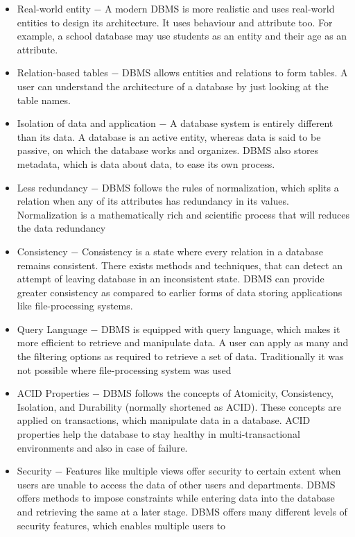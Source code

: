 \begin{itemize}
        \item{Real-world entity − A modern DBMS is more realistic and uses real-world entities to design
its architecture. It uses behaviour and attribute too. For example, a school database may use
students as an entity and their age as an attribute.}
     \item{Relation-based tables − DBMS allows entities and relations to form tables.
A user can understand the architecture of a database by just looking at the table names.}
    \item{Isolation of data and application − A database system is entirely different than its data. A
database is an active entity, whereas data is said to be passive, on which the database works
and organizes. DBMS also stores metadata, which is data about data, to ease its own
process.}
    \item{Less redundancy − DBMS follows the rules of normalization, which splits a relation when
any of its attributes has redundancy in its values. Normalization is a mathematically rich
and scientific process that will reduces the data redundancy}
        \item{Consistency − Consistency is a state where every relation in a database remains consistent.
There exists methods and techniques, that can detect an attempt of leaving database in an
inconsistent state. DBMS can provide greater consistency as compared to earlier forms of
data storing applications like file-processing systems.
}
\item{Query Language − DBMS is equipped with query language, which makes it more efficient
to retrieve and manipulate data. A user can apply as many and the filtering options as
required to retrieve a set of data. Traditionally it was not possible where file-processing
system was used}
\item{ACID Properties − DBMS follows the concepts of Atomicity, Consistency, Isolation, and
Durability (normally shortened as ACID). These concepts are applied on transactions,
which manipulate data in a database. ACID properties help the database to stay healthy in
multi-transactional environments and also in case of failure.}
\item{Security − Features like multiple views offer security to certain extent when users are
unable to access the data of other users and departments. DBMS offers methods to impose
constraints while entering data into the database and retrieving the same at a later stage.
DBMS offers many different levels of security features, which enables multiple users to
}
\end{itemize}
